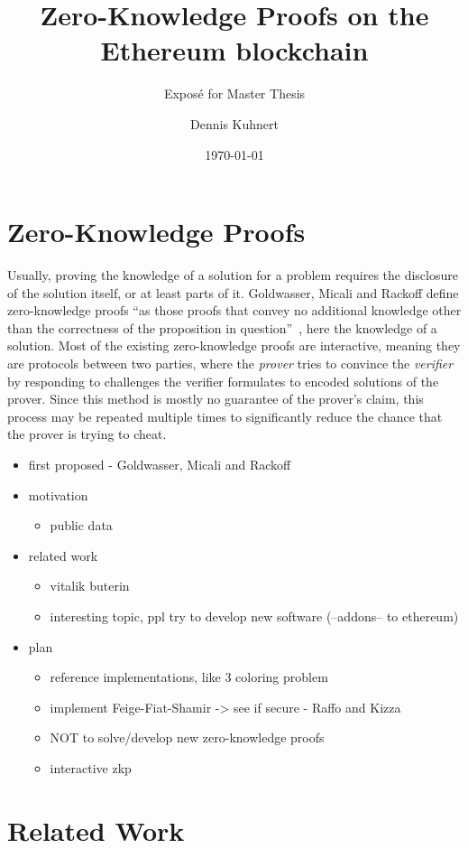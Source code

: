 \documentclass[a4paper,parskip=half]{scrartcl}
\title{Zero-Knowledge Proofs on the Ethereum blockchain}
\subtitle{Exposé for Master Thesis}
\author{Dennis Kuhnert}
\date{\today}
\begin{document}
\maketitle


\section{Zero-Knowledge Proofs}

Usually, proving the knowledge of a solution for a problem requires the disclosure of the solution itself, or at least parts of it.
Goldwasser, Micali and Rackoff define zero-knowledge proofs ``as those proofs that convey no additional knowledge other than the correctness of the proposition in question''~\cite{goldwasser1989knowledge}, here the knowledge of a solution.
Most of the existing zero-knowledge proofs are interactive, meaning they are protocols between two parties, where the \emph{prover} tries to convince the \emph{verifier} by responding to challenges the verifier formulates to encoded solutions of the prover.
Since this method is mostly no guarantee of the prover's claim, this process may be repeated multiple times to significantly reduce the chance that the prover is trying to cheat.

\begin{itemize}
\item first proposed - Goldwasser, Micali and Rackoff \cite{goldwasser1989knowledge}
\item motivation
	\begin{itemize}
	\item public data
	\end{itemize}
\item related work
	\begin{itemize}
	\item vitalik buterin \cite{buterin2015public}
	\item interesting topic, ppl try to develop new software (--addons-- to ethereum)
	\end{itemize}
\item plan
	\begin{itemize}
	\item reference implementations, like 3 coloring problem
	\item implement Feige-Fiat-Shamir -> see if secure - Raffo and Kizza \cite{raffo2002digital, kizza2010feige}
	\item NOT to solve/develop new zero-knowledge proofs
	\item interactive zkp
	\end{itemize}
\end{itemize}

\section{Related Work}



\end{document}
